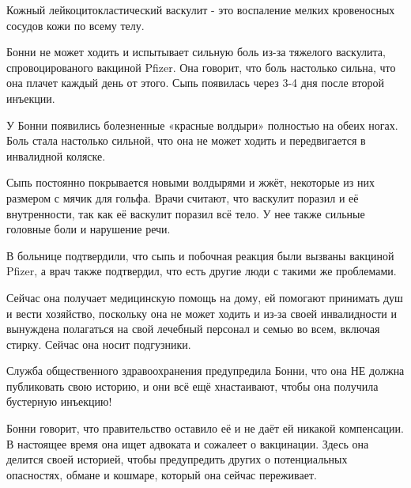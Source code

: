Кожный лейкоцитокластический васкулит - это воспаление мелких кровеносных
сосудов кожи по всему телу.

Бонни не может ходить и испытывает сильную боль из-за тяжелого васкулита,
спровоцированого вакциной Pfizer. Она говорит, что боль настолько сильна, что
она плачет каждый день от этого. Сыпь появилась через 3-4 дня после второй
инъекции.

У Бонни появились болезненные «красные волдыри» полностью на обеих ногах. Боль
стала настолько сильной, что она не может ходить и передвигается в инвалидной
коляске.

Сыпь постоянно покрывается новыми волдырями и жжёт, некоторые из них размером с
мячик для гольфа. Врачи считают, что васкулит поразил и её внутренности, так как
её васкулит поразил всё тело. У нее также сильные головные боли и нарушение
речи.

В больнице подтвердили, что сыпь и побочная реакция были вызваны вакциной
Pfizer, а врач также подтвердил, что есть другие люди с такими же проблемами.

Сейчас она получает медицинскую помощь на дому, ей помогают принимать душ и
вести хозяйство, поскольку она не может ходить и из-за своей инвалидности и
вынуждена полагаться на свой лечебный персонал и семью во всем, включая
стирку. Сейчас она носит подгузники.

Служба общественного здравоохранения предупредила Бонни, что она НЕ должна
публиковать свою историю, и они всё ещё хнастаивают, чтобы она получила
бустерную инъекцию!

Бонни говорит, что правительство оставило её и не даёт ей никакой компенсации. В
настоящее время она ищет адвоката и сожалеет о вакцинации. Здесь она делится
своей историей, чтобы предупредить других о потенциальных опасностях, обмане и
кошмаре, который она сейчас переживает.
